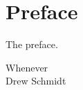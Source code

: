 \chapter*{Preface}

The preface.




\vfill
\text{ }  \hfill Whenever\\
\text{ } \hfill Drew Schmidt